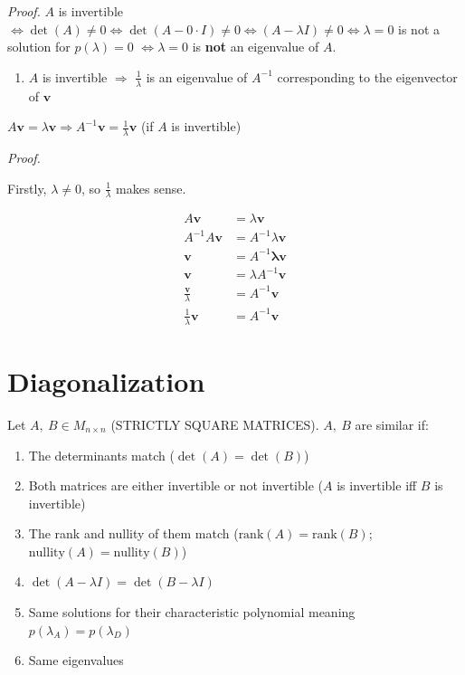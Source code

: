 \documentclass[
]{article}
\begin{document}
\emph{Proof.} $A$ is invertible
$\Leftrightarrow \det(A) \neq 0 \Leftrightarrow \det(A - 0 \cdot I) \neq 0 \Leftrightarrow (A - \lambda I) \neq 0 \Leftrightarrow \lambda = 0$
is not a solution for $p(\lambda) = 0$ $\Leftrightarrow \lambda = 0$
is \textbf{not} an eigenvalue of $A$.

\begin{enumerate}
\def\labelenumi{\arabic{enumi}.}
\setcounter{enumi}{2}
\item
  $A$ is invertible $\Rightarrow$ $\frac{1}{\lambda}$ is an
  eigenvalue of $A^{- 1}$ corresponding to the eigenvector of
  $\mathbf{v}$
\end{enumerate}

$A\mathbf{v} = \lambda\mathbf{v} \Rightarrow A^{- 1}\mathbf{v} = \frac{1}{\lambda}\mathbf{v}$
(if $A$ is invertible)

\emph{Proof.}

Firstly, $\lambda \neq 0$, so $\frac{1}{\lambda}$ makes sense.

\begin{align*}
A\mathbf{v} &= \lambda\mathbf{v}
 \\
A^{- 1}A\mathbf{v} &= A^{- 1}\lambda\mathbf{v}
 \\
\mathbf{v} &= A^{- 1}\mathbf{\lambda}\mathbf{v}
 \\
\mathbf{v} &= \lambda A^{- 1}\mathbf{v}
 \\
\frac{\mathbf{v}}{\lambda} &= A^{- 1}\mathbf{v}
 \\
\frac{1}{\lambda}\mathbf{v} &= A^{- 1}\mathbf{v}
\end{align*}



\section{Diagonalization}

Let $A,\ B \in M_{n \times n}$ (STRICTLY SQUARE MATRICES). $A,\ B$
are similar if:

\begin{enumerate}
\def\labelenumi{\arabic{enumi}.}
\item
  The determinants match ($\det(A) = \det(B)$)
\item
  Both matrices are either invertible or not invertible ($A$ is
  invertible iff $B$ is invertible)
\item
  The rank and nullity of them match
  ($\text{rank}(A) = \text{rank}(B)$;
  $\text{nullity}(A) = \text{nullity}(B)$)
\item
  $\det(A - \lambda I) = \det(B - \lambda I)$
\item
  Same solutions for their characteristic polynomial meaning
  $p\left( \lambda_{A} \right) = p\left( \lambda_{D} \right)$
\item
  Same eigenvalues
\end{enumerate}
\end{document}
